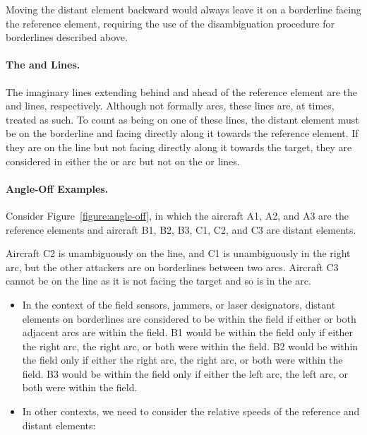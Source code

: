 {Moving the distant element backward would always leave it on a borderline facing the reference element, requiring the use of the disambiguation procedure for borderlines described above.

\paragraph{The  and  Lines.} The imaginary lines extending behind and ahead of the reference element are the  and  lines, respectively. Although not formally arcs, these lines are, at times, treated as such. To count as being on one of these lines, the distant element must be on the borderline and facing directly along it towards the reference element. If they are on the line but not facing directly along it towards the target, they are considered in either the  or  arc but not on the  or  lines.

\paragraph{Angle-Off Examples.}

Consider Figure~\ref{figure:angle-off}, in which the aircraft A1, A2, and A3 are the reference elements and aircraft B1, B2,  B3, C1, C2, and C3 are distant elements. 

Aircraft C2 is unambiguously on the  line, and C1 is unambiguously in the right  arc, but the other attackers are on borderlines between two arcs. Aircraft C3 cannot be on the  line as it is not facing the target and so is in the  arc.

\begin{itemize}

\item
In the context of the field sensors, jammers, or laser designators, distant elements on borderlines are considered to be within the field if either or both adjacent arcs are within the field. B1 would be within the field only if either the right  arc, the right  arc, or both were within the field. B2 would be within the field only if either the right  arc, the right  arc, or both were within the field. B3 would be within the field only if either the left  arc, the left  arc, or both were within the field.

\item In other contexts, we need to consider the relative speeds of the reference and distant elements:


\end{itemize}}
